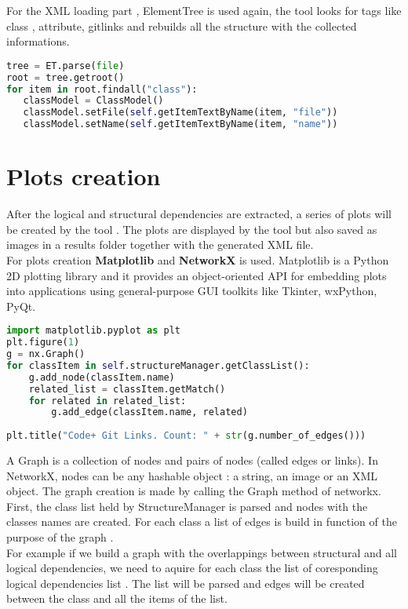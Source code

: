 \tab For the XML loading part , ElementTree is used again, the tool looks for tags like class , attribute, gitlinks and rebuilds all the structure with the collected informations.

\begin{lstlisting}[language=python, caption={Load informations from XML file using ElementTree.}]
tree = ET.parse(file)
root = tree.getroot()
for item in root.findall("class"):
   classModel = ClassModel()
   classModel.setFile(self.getItemTextByName(item, "file"))
   classModel.setName(self.getItemTextByName(item, "name"))
\end{lstlisting}

\section{Plots creation}
\tab After the logical and structural dependencies are extracted, a series of plots will be created by the tool . The plots are displayed by the tool but also saved as images in a results folder together with the generated XML file.\\
For plots creation \textbf{Matplotlib} and \textbf{NetworkX} is used. Matplotlib is a Python 2D plotting library and it provides an object-oriented API for embedding plots into applications using general-purpose GUI toolkits like Tkinter, wxPython, PyQt. 

\begin{lstlisting}[language=python, caption={Create plot with networkx.}]
 import matplotlib.pyplot as plt
plt.figure(1)
g = nx.Graph()
for classItem in self.structureManager.getClassList():
    g.add_node(classItem.name)
    related_list = classItem.getMatch()
    for related in related_list:
        g.add_edge(classItem.name, related)
       
plt.title("Code+ Git Links. Count: " + str(g.number_of_edges()))
\end{lstlisting}

\tab A Graph is a collection of nodes and pairs of nodes (called edges or links). In NetworkX, nodes can be any hashable object : a string, an image or an XML object. 
The graph creation is made by calling the Graph method of networkx. First, the class list held by StructureManager is parsed and nodes with the classes names are created. For each class a list of edges is build in function of the purpose of the graph .\\ For example if we build a graph with the overlappings between structural and all logical dependencies, we need to aquire for each class the list of coresponding logical dependencies list . The list will be parsed and edges will be created between the class and all the items of the list.
